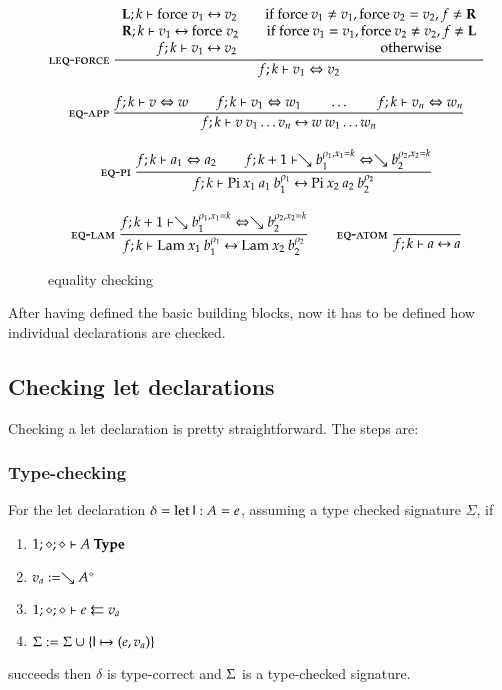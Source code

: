 \begin{figure}
\begin{gather*}
\nxru{\leqforce}
{\FeqVal{\lF}{k}{\forc \; v_1}{v_2} \qquad \mbox{if } \forc \: v_1 \neq v_1 , \forc \: v_2 = v_2  , f \neq \rF
}
{\FeqVal{\rF}{k}{v_1}{\forc \; v_2} \qquad \mbox{if } \forc \: v_1 = v_1 , \forc \: v_2 \neq v_2 , f \neq \lF }
{\FeqVal{f}{k}{v_1}{v_2} \qquad \qquad \qquad \qquad \qquad \mbox{ otherwise}}
{\EqVal{f}{k}{v_1}{v_2}}
\\[2ex]
\nru{\eqapp}
{\EqVal{f}{k}{v}{w} \qquad
\EqVal{f}{k}{v_1}{w_1} \qquad \ldots \qquad \EqVal{f}{k}{v_n}{w_n}}
{\FeqVal{f}{k}{v \: v_1 \ldots v_n}{w \: w_1 \ldots w_n}}
\\[2ex]
\nru{\eqpi}
{\EqVal{f}{k}{a_1}{a_2}
\qquad
\EqVal{f}{k+1}{\wh \cl{b_1}{\ins{\rho_1}{x_1}{k}}}{\wh \cl{b_2}{\ins{\rho_2}{x_2}{k}}}}
{\FeqVal{f}{k}{\vpi \: x_1 \: a_1 \: \cl{b_1}{\rho_1}}{\vpi \: x_2 \: a_2 \: \cl{b_2}{\rho_2}}}
\\[2ex]
\nru{\eqlam}
{\EqVal{f}{k+1}{\wh \cl{b_1}{\ins{\rho_1}{x_1}{k}}}{\wh \cl{b_2}{\ins{\rho_2}{x_2}{k}}}}
{\FeqVal{f}{k}{\vlam \: x_1 \: \cl{b_1}{\rho_1}}{\vlam \: x_2 \: \cl{b_2}{\rho_2}}}
\qquad
\nru{\eqatom}
{}
{\FeqVal{f}{k}{a}{a}}
\end{gather*}
\caption{equality checking}
\end{figure}

After having defined the basic building blocks, now it has to be defined how individual declarations are checked.

\subsection{Checking let declarations}
Checking a let declaration is pretty straightforward.
The steps are:
\subsubsection{Type-checking} 

For the let declaration $ \delta = \clet \dd : A = e $, assuming a type checked signature $\Sigma$, if
\begin{enumerate}
\item
$\IsType{1}{\diamond}{\diamond}{A}$
\item
$ v_a := \wh \cl{A}{\diamond}$
\item
$\Check{1}{\diamond}{\diamond}{e}{v_a}$
\item
$\Sig := \Sig \cup \{\dd \mapsto (e,v_a)\}$
\end{enumerate}
succeeds then $\delta$ is type-correct and $\Sig$ is a type-checked signature.


